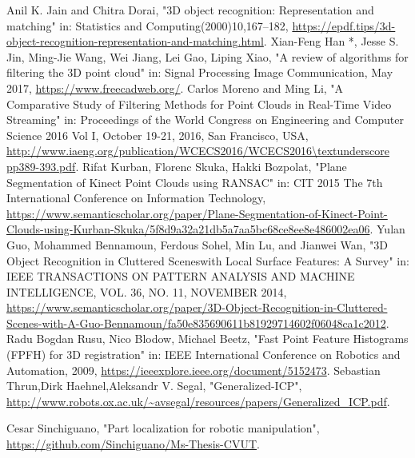 \begin{thebibliography}{1}
		Anil K. Jain and Chitra Dorai,
		"3D object recognition: Representation and matching" in: Statistics and Computing(2000)10,167–182, \url{https://epdf.tips/3d-object-recognition-representation-and-matching.html}.
		Xian-Feng Han *, Jesse S. Jin, Ming-Jie Wang, Wei Jiang, Lei Gao, Liping Xiao,
		"A review of algorithms for filtering the 3D point cloud" in: Signal Processing Image Communication, May 2017, \url{https://www.freecadweb.org/}.
		Carlos Moreno and Ming Li,
		"A Comparative Study of Filtering Methods for Point Clouds in Real-Time Video Streaming" in: Proceedings of the World Congress on Engineering and Computer Science 2016 Vol I, October 19-21, 2016, San Francisco, USA, \url{http://www.iaeng.org/publication/WCECS2016/WCECS2016\textunderscore pp389-393.pdf}.
		Rifat Kurban, Florenc Skuka, Hakki Bozpolat,
		"Plane Segmentation of Kinect Point Clouds using RANSAC" in: CIT 2015 The 7th International Conference on Information Technology, \url{https://www.semanticscholar.org/paper/Plane-Segmentation-of-Kinect-Point-Clouds-using-Kurban-Skuka/5f8d9a32a21db5a7aa5bc68ce8ee8e486002ea06}.
		Yulan Guo, Mohammed Bennamoun, Ferdous Sohel, Min Lu, and Jianwei Wan,
		"3D Object Recognition in Cluttered Sceneswith Local Surface Features: A Survey" in: IEEE TRANSACTIONS ON PATTERN ANALYSIS AND MACHINE INTELLIGENCE,  VOL. 36,  NO. 11,  NOVEMBER 2014, \url{https://www.semanticscholar.org/paper/3D-Object-Recognition-in-Cluttered-Scenes-with-A-Guo-Bennamoun/fa50e835690611b81929714602f06048ca1c2012}.
		Radu Bogdan Rusu, Nico Blodow, Michael Beetz,
		"Fast Point Feature Histograms (FPFH) for 3D registration" in: IEEE International Conference on Robotics and Automation, 2009, \url{https://ieeexplore.ieee.org/document/5152473}.
		Sebastian Thrun,Dirk Haehnel,Aleksandr V. Segal,
		"Generalized-ICP", \url{http://www.robots.ox.ac.uk/~avsegal/resources/papers/Generalized_ICP.pdf}.	

		Cesar Sinchiguano, 
		"Part localization for robotic manipulation", \url{https://github.com/Sinchiguano/Ms-Thesis-CVUT}.	





\end{thebibliography}
